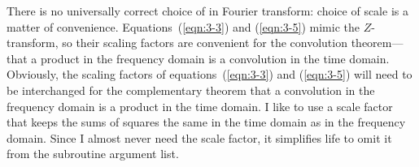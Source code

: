 \par
There is no universally correct choice
of  in Fourier transform:
choice of scale is a matter of convenience.
Equations~(\ref{eqn:3-3}) and (\ref{eqn:3-5}) mimic the $Z$-transform,
so their scaling factors are
convenient for the convolution theorem---that
a product in the frequency domain is a convolution in the time domain.
Obviously, the scaling factors of
equations~(\ref{eqn:3-3}) and (\ref{eqn:3-5})
will need to be interchanged for the
complementary theorem 
that a convolution in the frequency domain
is a product in the time domain.
I like to use a scale factor that keeps the sums of squares
the same in the time domain as in the frequency domain.
Since I almost never need the scale factor,
it simplifies life to omit it from the subroutine argument list.
\begin{comment}
When a scaling program is desired,
we can use a simple one like \texttt{scale()} \vpageref{lst:scale}.
Complex-valued data can be scaled with {\tt scale()}
merely by doubling the value of {\tt n}.

\progdex{scale}{scale an array}

\subsection{The simple FT code}
Subroutine \texttt{simpleft()} \vpageref{lst:simpleft} exhibits features
found in many physics and engineering programs.
For example, the time-domain signal (which is denoted ``{\tt tt()}"),
has {\tt nt} values subscripted, from {\tt tt(1)} to {\tt tt(nt)}.
The first value of this signal {\tt tt(1)} is located
in real physical time at {\tt t0}.
The time interval between values is {\tt dt}.
The value of {\tt tt(it)} is at time {\tt t0+(it-1)*dt}.
We do not use ``{\tt if}'' as a pointer on the frequency axis
because {\tt if} is a keyword in most programming languages.
Instead, we count along the frequency axis with a variable named {\tt ie}.%
\progdex{simpleft}{slow FT}
The total frequency band is
$2\pi$ radians per sample unit
or $1/\Delta t$ Hz.
Dividing the total interval by the number of points {\tt nf} gives $\Delta f$.
We could choose the frequencies to run from 0 to $2\pi$ radians/sample.
That would work well for many applications,
but it would be a nuisance for applications such as differentiation
in the frequency domain, which require multiplication by $-i\omega$
including the \bxbx{negative frequencies}{negative frequency}
as well as the positive.
So it seems more natural to begin at the most negative frequency
and step forward to the most positive frequency.
\end{comment}

